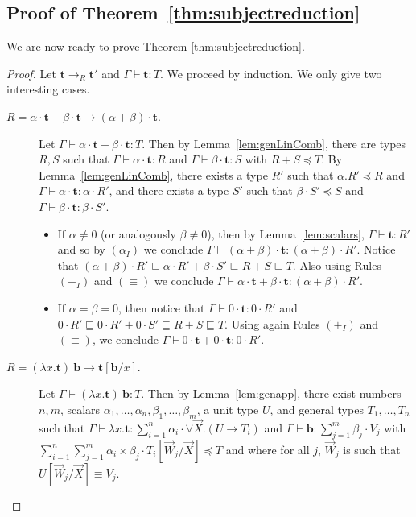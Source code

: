 \documentclass[colorlinks=true,linkcolor=black,urlcolor=black,citecolor=blue,submission,copyright,creativecommons]{eptcs}
\newcommand{\ve}[1]{\mathrm{\textbf{#1}}}
\newcommand{\type}{\colon\!}
\newcommand{\sui}[1]{\sum_{i=1}^{#1}}
\newcommand{\suj}[1]{\sum_{j=1}^{#1}}
\begin{document}
\subsection{Proof of Theorem~\ref{thm:subjectreduction}}
We are now ready to prove Theorem \ref{thm:subjectreduction}.

\begin{proof}
Let $\ve t\to_R\ve t'$ and $\Gamma\vdash\ve t\type T$. We proceed by induction. We only give two interesting cases.
\begin{description}
 \item[$R={\alpha\cdot\ve{t}+\beta\cdot\ve{t}}\to{(\alpha+\beta)\cdot\ve{t}}$.]
         Let $\Gamma\vdash\alpha\cdot\ve{t}+\beta\cdot\ve{t}\type T$. Then by
         Lemma~\ref{lem:genLinComb}, there are types $R,S$ such that
         $\Gamma\vdash\alpha\cdot\ve{t}\type R$ and
         $\Gamma\vdash\beta\cdot\ve{t}\type S$ with $R+S\preceq T$.
         By Lemma~\ref{lem:genLinComb}, there exists a type $R'$ such
         that $\alpha. R'\preceq R$
         and $\Gamma\vdash\alpha\cdot\ve t\type\alpha\cdot R'$, and there
         exists a type $S'$ such that $\beta\cdot S'\preceq S$ and $\Gamma\vdash\beta\cdot\ve t\type\beta\cdot S'$.
		\begin{itemize}
		 \item If $\alpha\neq 0$ (or analogously $\beta\neq 0$), then by Lemma~\ref{lem:scalars}, $\Gamma\vdash\ve t\type R'$ and so by $(\alpha_I)$ we conclude $\Gamma\vdash(\alpha+\beta)\cdot\ve t\type(\alpha+\beta)\cdot R'$. Notice that $(\alpha+\beta)\cdot R'\sqsubseteq\alpha\cdot R'+\beta\cdot S'\sqsubseteq R+S\sqsubseteq T$. Also using Rules $(+_I)$ and $(\equiv)$ we conclude $\Gamma\vdash\alpha\cdot \ve t+\beta\cdot \ve t\type (\alpha+\beta)\cdot R'$.
		 
		 \item If $\alpha=\beta=0$, then notice that
                   $\Gamma\vdash 0\cdot \ve t\type 0\cdot R'$ and
                   $0\cdot R'\sqsubseteq 0\cdot R'+0\cdot
                   S'\sqsubseteq R+S\sqsubseteq T$. Using again Rules $(+_I)$ and $(\equiv)$, we conclude $\Gamma\vdash 0\cdot \ve t+0\cdot \ve t\type 0\cdot R'$.
		\end{itemize}
		
\item[$R={(\lambda{x}.\ve{t})~\ve{b}}\to{\ve{t}[\ve{b}/ x]}$.]
      Let $\Gamma\vdash(\lambda{x}.\ve{t})~\ve{b}\type T$. Then by
      Lemma~\ref{lem:genapp}, there exist numbers $n, m$, scalars
      $\alpha_1,\dots,\alpha_n,\beta_1,\dots,\beta_m$, a unit type
      $U$, and general types $T_1,\dots,T_n$ such that
      $\Gamma\vdash\lambda x.\ve{t}\type\sui{n}\alpha_i\cdot
      \forall\vec{X}.(U\to T_i)$ and $\Gamma\vdash\ve{b}\type\suj{m}
      \beta_j\cdot V_j$ with $\sui{n}\suj{m}
      \alpha_i\times\beta_j\cdot T_i[\vec{W}_j/\vec{X}] \preceq T$ and
      where for all $j$, $\vec{W}_j$ is such that $U[\vec{W}_j/\vec{X}]\equiv V_j$.
       

\end{description}
\end{proof}
\end{document}
